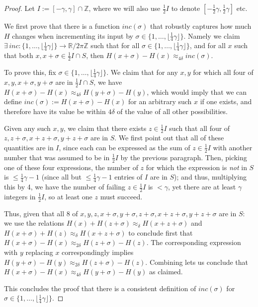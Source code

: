\documentclass[11pt]{article}
\theoremstyle{plain}
\begin{document}
\begin{proof}
Let $I:=[-\gamma,\gamma]\cap\mathbb{Z}$, where we will also use $\frac{1}{2}I$ to denote $[-\frac{1}{2}\gamma,\frac{1}{2}\gamma]$ etc.

We first prove that there is a function $inc(\sigma)$ that robustly captures how much $H$ changes when incrementing its input by $\sigma\in\{1,\ldots,\lfloor\frac{1}{4}\gamma\rfloor\}$. Namely we claim $\exists \,inc:\{1,\ldots,\lfloor\frac{1}{4}\gamma\rfloor\}\rightarrow \mathbb{R}/2\pi\mathbb{Z}$ such that for all $\sigma\in \{1,\ldots,\lfloor\frac{1}{4}\gamma\rfloor\}$, and for all $x$ such that both $x,x+\sigma\in \frac{1}{2}I\cap S$, then $H(x+\sigma)-H(x)\approx_{4\delta} inc(\sigma)$.

To prove this, fix $\sigma\in \{1,\ldots,\lfloor\frac{1}{4}\gamma\rfloor\}$. We claim that for any $x,y$ for which all four of $x,y,x+\sigma,y+\sigma$ are in $\frac{1}{2}I\cap S$, we have $H(x+\sigma)-H(x)\approx_{4\delta} H(y+\sigma)-H(y)$, which would imply that we can define $inc(\sigma):=H(x+\sigma)-H(x)$ for an arbitrary such $x$ if one exists, and therefore have its value be within $4\delta$ of the value of all other possibilities.
 
Given any such $x,y$, we claim that there exists $z\in\frac{1}{2}I$ such that all four of $z,z+\sigma,x+z+\sigma,y+z+\sigma$ are in $S$. We first point out that all of these quantities are in $I$, since each can be expressed  as the sum of $z\in\frac{1}{2}I$ with another number that was assumed to be in $\frac{1}{2}I$ by the previous paragraph. Then, picking one of these four expressions, the number of $z$ for which the expression is \textit{not} in $S$ is $\leq\frac{1}{4}\gamma-1$ (since all but $\leq\frac{1}{4}\gamma-1$ entries of $I$ are in $S$); and thus, multiplying this by 4, we have the number of failing $z\in\frac{1}{2}I$ is $<\gamma$, yet there are at least $\gamma$ integers in $\frac{1}{2}I$, so at least one $z$ must succeed.

Thus, given that all 8 of $x,y,z,x+\sigma,y+\sigma,z+\sigma,x+z+\sigma,y+z+\sigma$ are in $S$: we use the relations $H(x)+H(z+\sigma)\approx_\delta H(x+z+\sigma)$ and $H(x+\sigma)+H(z)\approx_\delta H(x+z+\sigma)$ to conclude first that $H(x+\sigma)-H(x)\approx_{2\delta} H(z+\sigma)-H(z)$. The corresponding expression with $y$ replacing $x$ correspondingly implies $H(y+\sigma)-H(y)\approx_{2\delta} H(z+\sigma)-H(z)$. Combining lets us conclude that $H(x+\sigma)-H(x)\approx_{4\delta} H(y+\sigma)-H(y)$ as claimed.

This concludes the proof that there is a consistent definition of $inc(\sigma)$ for $\sigma\in\{1,\ldots,\lfloor\frac{1}{4}\gamma\rfloor\}$.


\end{proof}
\end{document}
